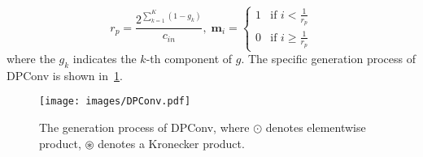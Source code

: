 {\small
\begin{equation} 
  r_p = \frac{2^{\sum_{k=1}^{K}(1-g_{k})}}{c_{in}},\; \mathbf{m}_i= 
  \begin{cases} 
  1 & \text{if } i < \frac{1}{r_p} \\
  0 & \text{if } i \geq \frac{1}{r_p}
  \end{cases} 
\end{equation}
}
where the {\small $g_{k}$} indicates the {\small $k$}-th component of {\small $g$}. The specific generation process of DPConv is shown in~\cref{fig:DPConv_modul}.
\begin{figure}[ht]
  \centering
  \texttt{[image: images/DPConv.pdf]}
  \caption{The generation process of DPConv, where $\odot$ denotes elementwise product, $\circledast $ denotes a Kronecker product.}
  \label{fig:DPConv_modul}
\end{figure}

